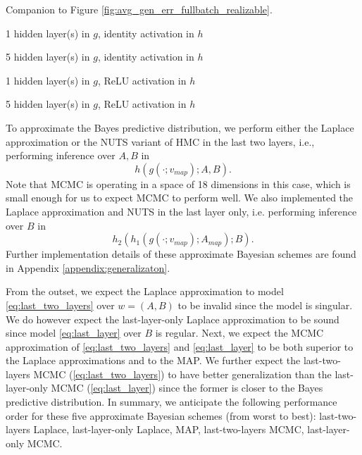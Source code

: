 \documentclass{article} %
\begin{document}
\begin{table}[h!]%
	\caption{Companion to Figure \ref{fig:avg_gen_err_fullbatch_realizable}.}
	\label{table:avg_gen_err_fullbatch_realizable}
	\centering
	\begin{tiny}
		\begin{subtable}[t]{2.5in}
			\caption{1 hidden layer(s) in $g$, identity activation in $h$}			
		\end{subtable}
		\quad
		\begin{subtable}[t]{2.5in}
			\caption{5 hidden layer(s) in $g$, identity activation in $h$}
			
		\end{subtable}
		\quad
		\begin{subtable}[t]{2.5in}
			\caption{1 hidden layer(s) in $g$, ReLU activation in $h$}
			
		\end{subtable}
		\quad
		\begin{subtable}[t]{2.5in}
			\caption{5 hidden layer(s) in $g$, ReLU activation in $h$}			
		\end{subtable}
	\end{tiny}
\end{table}

To approximate the Bayes predictive distribution, we perform either the Laplace approximation or the NUTS variant of HMC \citep{hoffman2014no} in the last two layers, i.e., performing inference over $A,B$ in
\begin{equation}
h(g(\cdot;v_{map});A,B).
\label{eq:last_two_layers}
\end{equation}
Note that MCMC is operating in a space of 18 dimensions in this case, which is small enough for us to expect MCMC to perform well.
We also implemented the Laplace approximation and NUTS in the last layer only, i.e. performing inference over $B$ in
\begin{equation}
h_2(h_1(g(\cdot;v_{map});A_{map}); B).
\label{eq:last_layer}
\end{equation}
Further implementation details of these approximate Bayesian schemes are found in Appendix \ref{appendix:generalizaton}.


From the outset, we expect the Laplace approximation to model \ref{eq:last_two_layers} over $w = (A, B)$ to be invalid since the model is singular. We do however expect the last-layer-only Laplace approximation to be sound since model \ref{eq:last_layer} over $B$ is regular. Next, we expect the MCMC approximation of \eqref{eq:last_two_layers} and \eqref{eq:last_layer} to be both superior to the Laplace approximations and to the MAP. We further expect the last-two-layers MCMC (\eqref{eq:last_two_layers}) to have better generalization than the last-layer-only MCMC (\eqref{eq:last_layer}) since the former is closer to the Bayes predictive distribution. In summary, we anticipate the following performance order for these five approximate Bayesian schemes (from worst to best): last-two-layers Laplace, last-layer-only Laplace, MAP, last-two-layers MCMC, last-layer-only MCMC.
\end{document}
